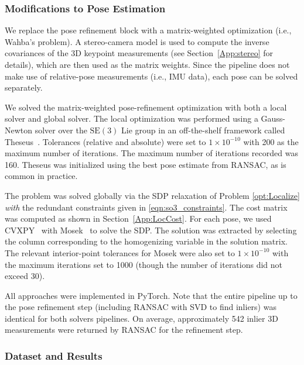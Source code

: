 \documentclass[lettersize,journal]{IEEEtran}
\begin{document}
\subsubsection{Modifications to Pose Estimation}

We replace the pose refinement block with a matrix-weighted optimization (i.e., Wahba's problem). A stereo-camera model is used to compute the inverse covariances of the 3D keypoint measurements (see Section~\ref{App:stereo} for details), which are then used as the matrix weights. Since the pipeline does not make use of relative-pose measurements (i.e., IMU data), each pose can be solved separately. 

We solved the matrix-weighted pose-refinement optimization with both a local solver and global solver. The local optimization was performed using a Gauss-Newton solver over the $\mbox{SE}(3)$ Lie group in an off-the-shelf framework called Theseus~\cite{pinedaTheseusLibraryDifferentiable2022}. Tolerances (relative and absolute) were set to $1\times10^{-10}$ with 200 as the maximum number of iterations. The maximum number of iterations recorded was 160. Theseus was initialized using the best pose estimate from RANSAC, as is common in practice. 

The problem was solved globally via the SDP relaxation of Problem \eqref{opt:Localize} \emph{with} the redundant constraints given in \eqref{eqn:so3_constraints}. The cost matrix was computed as shown in Section~\ref{App:LocCost}. For each pose, we used CVXPY~\cite{diamondCVXPYPythonEmbeddedModeling} with Mosek~\cite{mosek} to solve the SDP. The solution was extracted by selecting the column corresponding to the homogenizing variable in the solution matrix. The relevant interior-point tolerances for Mosek were also set to $1\times10^{-10}$ with the maximum iterations set to 1000 (though the number of iterations did not exceed 30).

All approaches were implemented in PyTorch. Note that the entire pipeline up to the pose refinement step (including RANSAC with SVD to find inliers) was identical for both solvers pipelines. On average, approximately 542 inlier 3D measurements were returned by RANSAC for the refinement step.  

\subsubsection{Dataset and Results}
\end{document}
